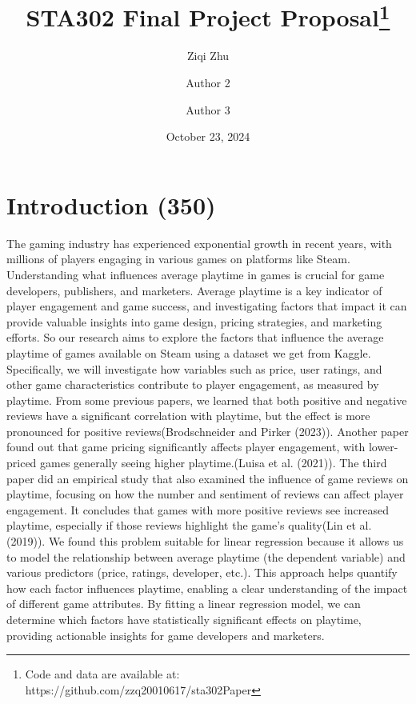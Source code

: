 \documentclass[
  letterpaper,
  DIV=11,
  numbers=noendperiod]{scrartcl}
\title{STA302 Final Project Proposal\thanks{Code and data are available
at: https://github.com/zzq20010617/sta302Paper}}
\author{Ziqi Zhu \and Author 2 \and Author 3}
\date{October 23, 2024}
\renewcommand*\contentsname{Table of contents}
\newcommand\contentsname{Table of contents}
\begin{document}
\maketitle
\ifdefined\Shaded\renewenvironment{Shaded}{\begin{tcolorbox}[interior hidden, boxrule=0pt, sharp corners, frame hidden, breakable, enhanced, borderline west={3pt}{0pt}{shadecolor}]}{\end{tcolorbox}}\fi

\renewcommand*\contentsname{Table of contents}
{
\hypersetup{linkcolor=}
\setcounter{tocdepth}{3}
\tableofcontents
}
\hypertarget{introduction-350}{%
\section{Introduction (350)}\label{introduction-350}}

The gaming industry has experienced exponential growth in recent years,
with millions of players engaging in various games on platforms like
Steam. Understanding what influences average playtime in games is
crucial for game developers, publishers, and marketers. Average playtime
is a key indicator of player engagement and game success, and
investigating factors that impact it can provide valuable insights into
game design, pricing strategies, and marketing efforts. So our research
aims to explore the factors that influence the average playtime of games
available on Steam using a dataset we get from Kaggle. Specifically, we
will investigate how variables such as price, user ratings, and other
game characteristics contribute to player engagement, as measured by
playtime. From some previous papers, we learned that both positive and
negative reviews have a significant correlation with playtime, but the
effect is more pronounced for positive reviews(Brodschneider and Pirker
(2023)). Another paper found out that game pricing significantly affects
player engagement, with lower-priced games generally seeing higher
playtime.(Luisa et al. (2021)). The third paper did an empirical study
that also examined the influence of game reviews on playtime, focusing
on how the number and sentiment of reviews can affect player engagement.
It concludes that games with more positive reviews see increased
playtime, especially if those reviews highlight the game's quality(Lin
et al. (2019)). We found this problem suitable for linear regression
because it allows us to model the relationship between average playtime
(the dependent variable) and various predictors (price, ratings,
developer, etc.). This approach helps quantify how each factor
influences playtime, enabling a clear understanding of the impact of
different game attributes. By fitting a linear regression model, we can
determine which factors have statistically significant effects on
playtime, providing actionable insights for game developers and
marketers.
\end{document}
